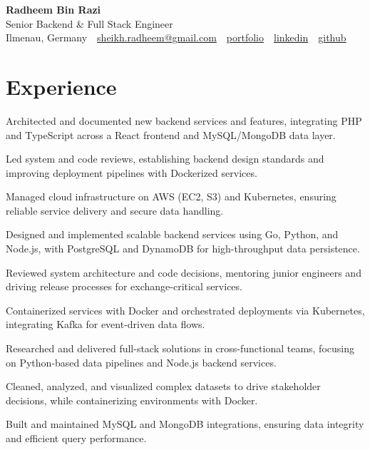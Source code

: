 \documentclass[11pt,a4paper]{resume}
\makeatletter
\newcommand{\Portfolio}{https://radheem.github.io/my-cv}
\newcommand{\PortfolioText}{portfolio}
\newcommand{\GitHub}{https://github.com/radheem}
\newcommand{\LinkedIn}{https://www.linkedin.com/in/radheem-razi}
\newcommand{\Email}{sheikh.radheem@gmail.com}
\makeatother
\begin{document}
\begin{center}
  {\huge\bfseries Radheem Bin Razi}\\[3pt]
  {\large Senior Backend \& Full Stack Engineer}\\[6pt]
  \small
  Ilmenau, Germany \,\textbar\,
  \href{mailto:\Email}{\Email} \,\textbar\,
  \href{\Portfolio}{\PortfolioText} \,\textbar\,
  \href{\LinkedIn}{linkedin} \,\textbar\,
  \href{\GitHub}{github}
\end{center}
\vspace{2pt}

\section{Experience}

\bullets
  \item Architected and documented new backend services and features, integrating PHP and TypeScript across a React frontend and MySQL/MongoDB data layer.
  \item Led system and code reviews, establishing backend design standards and improving deployment pipelines with Dockerized services.
  \item Managed cloud infrastructure on AWS (EC2, S3) and Kubernetes, ensuring reliable service delivery and secure data handling.
\bulletsend
\vspace{3pt}
\bullets
  \item Designed and implemented scalable backend services using Go, Python, and Node.js, with PostgreSQL and DynamoDB for high-throughput data persistence.
  \item Reviewed system architecture and code decisions, mentoring junior engineers and driving release processes for exchange-critical services.
  \item Containerized services with Docker and orchestrated deployments via Kubernetes, integrating Kafka for event-driven data flows.
\bulletsend
\vspace{3pt}
\bullets
  \item Researched and delivered full-stack solutions in cross-functional teams, focusing on Python-based data pipelines and Node.js backend services.
  \item Cleaned, analyzed, and visualized complex datasets to drive stakeholder decisions, while containerizing environments with Docker.
  \item Built and maintained MySQL and MongoDB integrations, ensuring data integrity and efficient query performance.
\bulletsend
\vspace{3pt}
\end{document}
